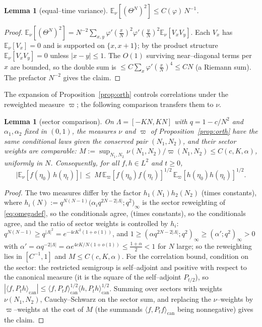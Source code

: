 \documentclass[11pt]{article}
\theoremstyle{plain}
\newtheorem{lemma}[theorem]{Lemma}
\theoremstyle{definition}
\theoremstyle{remark}
\newcommand{\E}{\mathbb{E}}\newcommand{\PP}{\mathbb{P}}\newcommand{\dd}{\,\mathrm{d}}
\begin{document}
\begin{lemma}[equal--time variance]\label{lem:eqvar}
$\E_\nu[(\Theta^N)^2]\le C(\varphi)\,N^{-1}$.
\end{lemma}
\begin{proof}
$\E_\nu[(\Theta^N)^2]=N^{-2}\sum_{x,y}\varphi'(\tfrac xN)^2\varphi'(\tfrac yN)^2\E_\nu[V_xV_y]$.
Each $V_x$ has $\E_\nu[V_x]=0$ and is supported on $\{x,x+1\}$; by the product structure
$\E_\nu[V_xV_y]=0$ unless $|x-y|\le1$. The $O(1)$ surviving near--diagonal terms per $x$
are bounded, so the double sum is $\le C\sum_x\varphi'(\tfrac xN)^4\le CN$ (a Riemann
sum). The prefactor $N^{-2}$ gives the claim.
\end{proof}

The expansion of Proposition~\ref{prop:orth} controls correlations under the
reweighted measure $\varpi$; the following comparison transfers them to $\nu$.

\begin{lemma}[sector comparison]\label{lem:sector}
On $\Lambda=[-KN,KN]$ with $q=1-c/N^2$ and $\alpha_1,\alpha_2$ fixed in $(0,1)$, the
measures $\nu$ and $\varpi$ of Proposition~\ref{prop:orth} have the same conditional
laws given the conserved pair $(N_1,N_2)$, and their sector weights are comparable:
$M:=\sup_{N_1,N_2}\nu(N_1,N_2)/\varpi(N_1,N_2)\le C(c,K,\alpha)$, uniformly in $N$.
Consequently, for all $f,h\in L^2$ and $t\ge0$,
\[
  \big|\E_\nu[f(\eta_0)\,h(\eta_t)]\big|\ \le\ M\,
  \E_\varpi[f(\eta_0)f(\eta_t)]^{1/2}\,\E_\varpi[h(\eta_0)h(\eta_t)]^{1/2}.
\]
\end{lemma}
\begin{proof}
The two measures differ by the factor $h_1(N_1)h_2(N_2)$ (times constants), where
$h_i(N):=q^{N(N-1)}\big(\alpha_i q^{2N-2|\Lambda|};q^2\big)_\infty$ is the sector
reweighting of \eqref{eq:omegadef}, so the conditionals agree,
(times constants), so the conditionals agree, and the ratio of sector weights is
controlled by $h_i$: $q^{N(N-1)}\ge q^{|\Lambda|^2}=e^{-4cK^2(1+o(1))}$, and
$1\ge(\alpha q^{2N-2|\Lambda|};q^2)_\infty\ge(\alpha';q^2)_\infty>0$ with
$\alpha'=\alpha q^{-2|\Lambda|}=\alpha e^{4cK/N(1+o(1))}\le\tfrac{1+\alpha}2<1$ for
$N$ large; so the reweighting lies in $[C^{-1},1]$ and $M\le C(c,K,\alpha)$. For the
correlation bound, condition on the sector: the restricted semigroup is
self--adjoint and positive with respect to the canonical measure (it is the square
of the self--adjoint $P_{t/2}$), so
$|\langle f,P_th\rangle_{\mathrm{can}}|\le
\langle f,P_tf\rangle_{\mathrm{can}}^{1/2}\langle h,P_th\rangle_{\mathrm{can}}^{1/2}$.
Summing over sectors with weights $\nu(N_1,N_2)$, Cauchy--Schwarz on the sector sum,
and replacing the $\nu$--weights by $\varpi$--weights at the cost of $M$ (the
summands $\langle f,P_tf\rangle_{\mathrm{can}}$ being nonnegative) gives the claim.
\end{proof}
\end{document}
